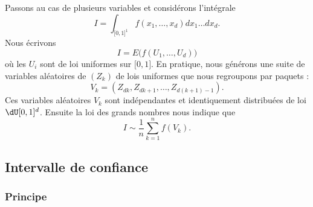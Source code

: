 Passons au cas de plusieurs variables et considérons l'intégrale
\begin{equation}
    I=\int_{\mathopen[ 0 , 1 \mathclose]^1}f(x_1,\ldots,x_d)dx_1\ldots dx_d.
\end{equation}
Nous écrivons
\begin{equation}
    I=E\big( f(U_1,\ldots,U_d) \big)
\end{equation}
où les \( U_i\) sont de loi uniformes sur \( \mathopen[ 0 , 1 \mathclose]\). En pratique, nous générons une suite de variables aléatoires de \( (Z_k)\) de lois uniformes que nous regroupons par paquets :
\begin{equation}
    V_k=(Z_{dk},Z_{dk+1},\ldots,Z_{d(k+1)-1}).
\end{equation}
Ces variables aléatoires \( V_k\) sont indépendantes et identiquement distribuées de loi \( \dU\mathopen[ 0 , 1 \mathclose]^{d}\). Ensuite la loi des grands nombres nous indique que
\begin{equation}
    I\sim\frac{1}{ n }\sum_{k=1}^nf(V_k).
\end{equation}

\subsection{Intervalle de confiance}

\subsubsection{Principe}

